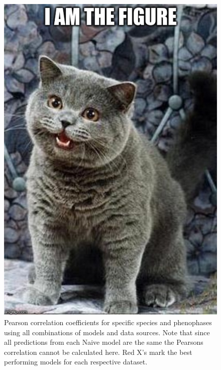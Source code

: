 \begin{figure}
	\centering
	\includegraphics[scale=0.5]{images/figure_filler.jpg}
	\caption[Pearson correlation coefficients for specific species and phenophases using all combinations of models and data sources]{Pearson correlation coefficients for specific species and phenophases using all combinations of models and data sources. Note that since all predictions from each Naive model are the same the Pearsons correlation cannot be calculated here. Red X's mark the best performing models for each respective dataset.} \label{fig-a-6}
\end{figure}

\newpage


